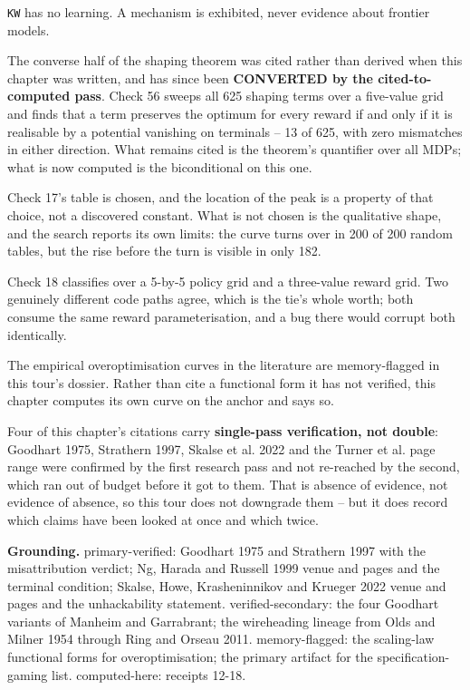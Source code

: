 \texttt{KW} has no learning. A mechanism is exhibited, never evidence about frontier models.

The converse half of the shaping theorem was cited rather than derived when this chapter was written, and has since been \textbf{CONVERTED by the cited-to-computed pass}. Check 56 sweeps all 625 shaping terms over a five-value grid and finds that a term preserves the optimum for every reward if and only if it is realisable by a potential vanishing on terminals -- 13 of 625, with zero mismatches in either direction. What remains cited is the theorem's quantifier over all MDPs; what is now computed is the biconditional on this one.

Check 17's table is chosen, and the location of the peak is a property of that choice, not a discovered constant. What is not chosen is the qualitative shape, and the search reports its own limits: the curve turns over in 200 of 200 random tables, but the rise before the turn is visible in only 182.

Check 18 classifies over a 5-by-5 policy grid and a three-value reward grid. Two genuinely different code paths agree, which is the tie's whole worth; both consume the same reward parameterisation, and a bug there would corrupt both identically.

The empirical overoptimisation curves in the literature are memory-flagged in this tour's dossier. Rather than cite a functional form it has not verified, this chapter computes its own curve on the anchor and says so.

Four of this chapter's citations carry \textbf{single-pass verification, not double}: Goodhart 1975, Strathern 1997, Skalse et al. 2022 and the Turner et al. page range were confirmed by the first research pass and not re-reached by the second, which ran out of budget before it got to them. That is absence of evidence, not evidence of absence, so this tour does not downgrade them -- but it does record which claims have been looked at once and which twice.

\textbf{Grounding.} primary-verified: Goodhart 1975 and Strathern 1997 with the misattribution verdict; Ng, Harada and Russell 1999 venue and pages and the terminal condition; Skalse, Howe, Krasheninnikov and Krueger 2022 venue and pages and the unhackability statement. verified-secondary: the four Goodhart variants of Manheim and Garrabrant; the wireheading lineage from Olds and Milner 1954 through Ring and Orseau 2011. memory-flagged: the scaling-law functional forms for overoptimisation; the primary artifact for the specification-gaming list. computed-here: receipts 12-18.

